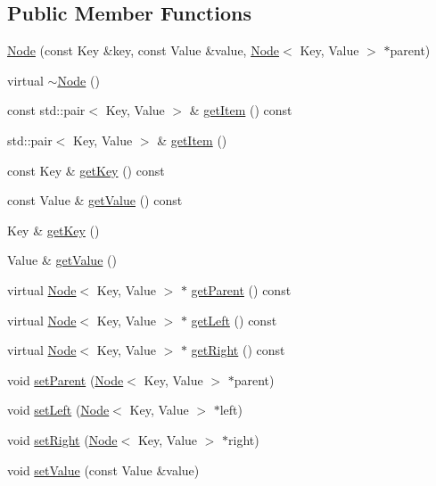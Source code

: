\subsection*{Public Member Functions}
\begin{DoxyCompactItemize}
\item 
\hyperlink{classNode_ac9bdc0036be15ac4b622696c804c501f}{Node} (const Key \&key, const Value \&value, \hyperlink{classNode}{Node}$<$ Key, Value $>$ $\ast$parent)
\item 
virtual \hyperlink{classNode_aaa753148a7bac7330974f1a9bc9249f1}{$\sim$\-Node} ()
\item 
const std\-::pair$<$ Key, Value $>$ \& \hyperlink{classNode_a09f9422272855f3583839846de472955}{get\-Item} () const 
\item 
std\-::pair$<$ Key, Value $>$ \& \hyperlink{classNode_a70d9c3ef40626b812c9c269deeada095}{get\-Item} ()
\item 
const Key \& \hyperlink{classNode_af3cf68af83ff64ae1e947e433a57b92b}{get\-Key} () const 
\item 
const Value \& \hyperlink{classNode_a64a6ad9046786cf75f7005cfd71385e2}{get\-Value} () const 
\item 
Key \& \hyperlink{classNode_a0c782e141b79c6cb09898bbf191b2baf}{get\-Key} ()
\item 
Value \& \hyperlink{classNode_abdbbc3b9627d1bfe2106c2000d410811}{get\-Value} ()
\item 
virtual \hyperlink{classNode}{Node}$<$ Key, Value $>$ $\ast$ \hyperlink{classNode_a89780f3166c5d3aad0bd2960ce65f7a8}{get\-Parent} () const 
\item 
virtual \hyperlink{classNode}{Node}$<$ Key, Value $>$ $\ast$ \hyperlink{classNode_a2c142346d13ce08214ebee5ab76fbf72}{get\-Left} () const 
\item 
virtual \hyperlink{classNode}{Node}$<$ Key, Value $>$ $\ast$ \hyperlink{classNode_ae9aabb17b3555af256dc9ae091c0bb39}{get\-Right} () const 
\item 
void \hyperlink{classNode_a981799e30e7649812c2ad3a2d43c3f94}{set\-Parent} (\hyperlink{classNode}{Node}$<$ Key, Value $>$ $\ast$parent)
\item 
void \hyperlink{classNode_af0a4ecd342adca0c1db88f0811ad0068}{set\-Left} (\hyperlink{classNode}{Node}$<$ Key, Value $>$ $\ast$left)
\item 
void \hyperlink{classNode_ade5c16875afa559250c7a49d56007685}{set\-Right} (\hyperlink{classNode}{Node}$<$ Key, Value $>$ $\ast$right)
\item 
void \hyperlink{classNode_ab9b9a0da6a6b481623a3d1a7de5594a9}{set\-Value} (const Value \&value)
\end{DoxyCompactItemize}
